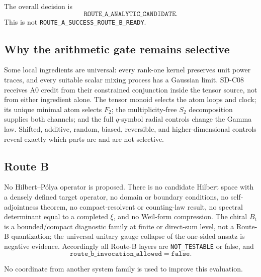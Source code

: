 The overall decision is
\[
 \texttt{ROUTE\_A\_ANALYTIC\_CANDIDATE}.
\]
This is not \texttt{ROUTE\_A\_SUCCESS\_ROUTE\_B\_READY}.

\subsection{Why the arithmetic gate remains selective}

Some local ingredients are universal: every rank-one kernel preserves unit
power traces, and every suitable scalar mixing process has a Gaussian limit.
SD-C08 receives A0 credit from their constrained conjunction inside the
tensor source, not from either ingredient alone. The tensor monoid selects
the atom loops and clock; its unique minimal atom selects $F_2$; the
multiplicity-free $S_2$ decomposition supplies both channels; and the full
$q$-symbol radial controls change the Gamma law. Shifted, additive, random,
biased, reversible, and higher-dimensional controls reveal exactly which
parts are and are not selective.

\subsection{Route B}

No Hilbert--P\'olya operator is proposed. There is no candidate Hilbert space
with a densely defined target operator, no domain or boundary conditions, no
self-adjointness theorem, no compact-resolvent or counting-law result, no
spectral determinant equal to a completed $\xi$, and no Weil-form
compression. The chiral $B_t$ is a bounded/compact diagnostic family at
finite or direct-sum level, not a Route-B quantization; the universal unitary
gauge collapse of the one-sided ansatz is negative evidence. Accordingly all Route-B layers are
\texttt{NOT\_TESTABLE} or false, and
\[
 \mathtt{route\_b\_invocation\_allowed=false}.
\]

No coordinate from another system family is used to improve this evaluation.
